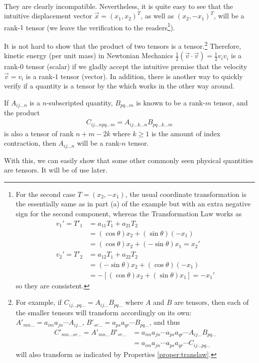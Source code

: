 \begin{solution}
\begin{align*}
\end{align*}
They are clearly incompatible. Nevertheless, it is quite easy to see that the intuitive displacement vector $\vec{x} = (x_1,x_2)^T$, as well as $(x_2,-x_1)^T$, will be a rank-$1$ tensor (we leave the verification to the readers\footnote{For the second case $T = (x_2, -x_1)$, the usual coordinate transformation is the essentially same as in part (a) of the example but with an extra negative sign for the second component, whereas the Transformation Law works as
\begin{align*}
v_1' = T'_1 &= a_{11}T_1 + a_{21}T_2 \\
&= (\cos \theta) x_2 + (\sin \theta) (-x_1) \\
&= (\cos \theta) x_2 + (-\sin \theta) x_1 = x_2' \\
v_2' = T'_2 &= a_{12}T_1 + a_{22}T_2 \\
&= (-\sin\theta) x_2 + (\cos\theta) (-x_1) \\
&= -[(\cos \theta) x_2 + (\sin\theta) x_1] = -x_1'
\end{align*} so they are consistent.}).
\end{solution}
It is not hard to show that the product of two tensors is a tensor.\footnote{For example, if $C_{ij\ldots pq\ldots} = A_{ij\ldots}B_{pq\ldots}$ where $A$ and $B$ are tensors, then each of the smaller tensors will transform accordingly on its own: $A'_{mn\ldots} = a_{im}a_{jn}\cdots A_{ij\ldots}$, $B'_{sr\ldots} = a_{ps}a_{qr}\cdots B_{pq\ldots}$, and thus
\begin{align*}
C'_{mn\ldots sr\ldots} = A'_{mn\ldots}B'_{sr\ldots} &= a_{im}a_{jn}\cdots a_{ps}a_{qr}\cdots A_{ij\ldots} B_{pq\ldots} \\
&= a_{im}a_{jn}\cdots a_{ps}a_{qr}\cdots C_{ij\ldots pq\ldots}
\end{align*} will also transform as indicated by Properties \ref{proper:translaw}.} Therefore, kinetic energy (per unit mass) in Newtonian Mechanics $\frac{1}{2}(\vec{v} \cdot \vec{v}) = \frac{1}{2}v_iv_i$ is a rank-$0$ tensor (scalar) if we gladly accept the intuitive premise that the velocity $\vec{v} = v_i$ is a rank-$1$ tensor (vector). In addition, there is another way to quickly verify if a quantity is a tensor by the  which works in the other way around.
\begin{thm}
\label{thm:quotientl}
If $A_{ij\ldots n}$ is a $n$-subscripted quantity, $B_{pq\ldots m}$ is known to be a rank-$m$ tensor, and the product
\begin{align*}
C_{ij\ldots npq \ldots m} = A_{ij\ldots k\ldots n} B_{pq\ldots k\ldots m}   
\end{align*}
is also a tensor of rank $n+m-2k$ where $k \geq 1$ is the amount of index contraction, then $A_{ij\ldots n}$ will be a rank-$n$ tensor.
\end{thm}
With this, we can easily show that some other commonly seen physical quantities are tensors. It will be of use later. 


